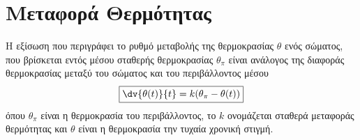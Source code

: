 



\pagestyle{vangelis}




\begin{center}
  \minibox{\large\bfseries \textcolor{Col1}{Προβλήματα σδε 1ης τάξης}}
\end{center}


\section*{Μεταφορά Θερμότητας}

Η εξίσωση που περιγράφει το ρυθμό μεταβολής της θερμοκρασίας $\theta$ ενός σώματος, που 
βρίσκεται εντός μέσου σταθερής θερμοκρασίας $ \theta_{\pi} $ είναι ανάλογος της διαφοράς 
θερμοκρασίας μεταξύ του σώματος και του περιβάλλοντος μέσου
\[
  \boxed{  \dv{\theta(t)}{t} = k (\theta _{\pi} - \theta(t))}
\] 
όπου $ \theta _{\pi} $ είναι η θερμοκρασία του περιβάλλοντος, το $k$ ονομάζεται 
σταθερά μεταφοράς θερμότητας και $\theta$ είναι η θερμοκρασία την τυχαία 
χρονική στιγμή.

